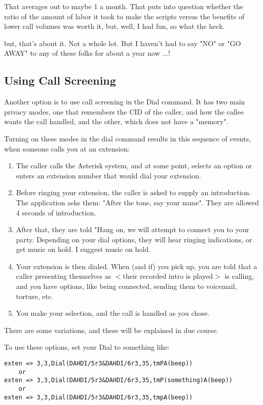 That averages out to maybe 1 a month. That puts into question whether
the ratio of the amount of labor it took to make the scripts versus
the benefits of lower call volumes was worth it, but, well, I had fun,
so what the heck.

but, that's about it. Not a whole lot. But I haven't had to say "NO"
or "GO AWAY" to any of these folks for about a year now ...!

\subsection{Using Call Screening}

Another option is to use call screening in the Dial command. It has
two main privacy modes, one that remembers the CID of the caller, and
how the callee wants the call handled, and the other, which does not
have a "memory".

Turning on these modes in the dial command results in this sequence of
events, when someone calls you at an extension:

\begin{enumerate}
\item The caller calls the Asterisk system, and at some point, selects an
option or enters an extension number that would dial your extension.

\item Before ringing your extension, the caller is asked to supply an
introduction. The application asks them: "After the tone, say your
name". They are allowed 4 seconds of introduction.

\item After that, they are told "Hang on, we will attempt to connect you
to your party. Depending on your dial options, they will hear ringing
indications, or get music on hold. I suggest music on hold.

\item Your extension is then dialed. When (and if) you pick up, you are
told that a caller presenting themselves as $<$their recorded intro is
played$>$ is calling, and you have options, like being connected,
sending them to voicemail, torture, etc.

\item You make your selection, and the call is handled as you chose.
\end{enumerate}

There are some variations, and these will be explained in due course.


To use these options, set your Dial to something like:
\begin{astlisting}
\begin{verbatim}
exten => 3,3,Dial(DAHDI/5r3&DAHDI/6r3,35,tmPA(beep))
    or
exten => 3,3,Dial(DAHDI/5r3&DAHDI/6r3,35,tmP(something)A(beep))
    or
exten => 3,3,Dial(DAHDI/5r3&DAHDI/6r3,35,tmpA(beep))
\end{verbatim}
\end{astlisting}


